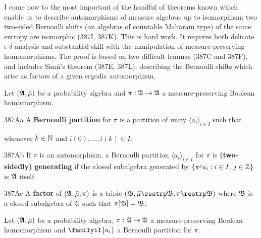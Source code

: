 
\def\barln{\mathop{\bar{\text{ln}}}}

\def\chaptername{Automorphisms}
\def\sectionname{Ornstein's theorem}


I come now to the most important of the handful of theorems known which
enable us to describe automorphisms of measure algebras up to
isomorphism:  two two-sided Bernoulli shifts (on algebras of countable Maharam type) of the same entropy are isomorphic (387I, 387K).   This is hard work.
It requires both
delicate $\epsilon$-$\delta$ analysis and substantial skill with the
manipulation of measure-preserving homomorphisms.   The proof is based
on two difficult lemmas (387C and 387F), and includes Sina\v\i's theorem
(387E, 387L), describing the Bernoulli shifts which arise as
factors of a given ergodic automorphism.

 Let $(\frak A,\bar\mu)$ be a probability
algebra and $\pi:\frak A\to\frak A$ a measure-preserving Boolean
homomorphism.

\spheader 387Aa A {\bf Bernoulli partition} for $\pi$ is a partition of
unity $\langle a_i\rangle_{i\in I}$ such that


\noindent whenever $k\in\Bbb N$ and $i(0),\ldots,i(k)\in I$.

\spheader 387Ab If $\pi$ is an automorphism, a Bernoulli partition
$\langle a_i\rangle_{i\in I}$ for $\pi$ is {\bf (two-sidedly)
generating}
if the closed subalgebra generated by $\{\pi^ja_i:i\in I,\,j\in\Bbb Z\}$
is $\frak A$ itself.

\spheader 387Ac A {\bf factor} of $(\frak A,\bar\mu,\pi)$ is a triple
$(\frak B,\bar\mu\restrp\frak B,\pi\restrp\frak B)$ where $\frak B$ is a
closed subalgebra of $\frak A$ such that $\pi[\frak B]=\frak B$.

 Let %
$(\frak A,\bar\mu)$ be a probability algebra,
$\pi:\frak A\to\frak A$ a measure-preserving Boolean homomorphism and
$\familyiI{a_i}$ a Bernoulli partition for $\pi$.

